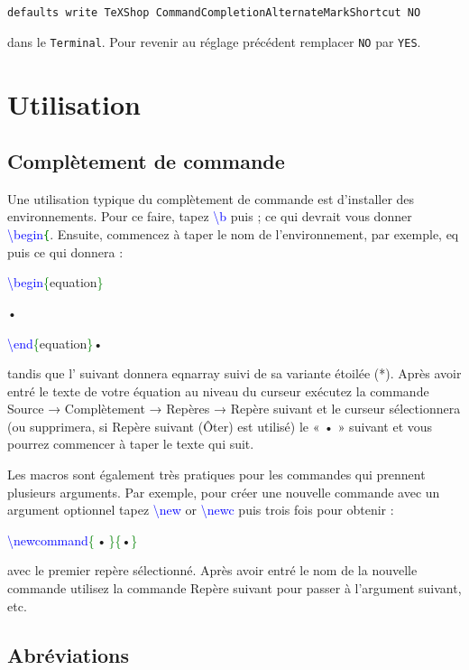 \documentclass[12pt,french]{article}
\newcommand{\esc}{{\WD \symbol{82}}}
\newcommand{\pointbleu}{\colorbox{cyan!40}{\kern-3pt•\kern-3pt}}
\newcommand{\pointbleua}{\,\colorbox{cyan!40}{\kern-4pt•\kern-4pt}\,}
\newcommand{\fontelatex}{\ttfamily}
\newcommand{\argument}[1]{{\fontelatex#1}}
\newcommand{\opt}[1]{{\fontelatex[#1]}}
\newcommand{\argt}[1]{{\fontelatex\textcolor{green}{\{}#1\textcolor{green}{\}}}}
\newcommand{\com}[1]{{\fontelatex\textcolor{blue}{\textbackslash#1}}}
\newcommand{\coma}[2]{\com{#1}\argt{#2}}
\begin{document}
\texttt{defaults write TeXShop CommandCompletionAlternateMarkShortcut NO}

\noindent dans le \texttt{Terminal}. Pour revenir au réglage précédent remplacer \texttt{NO} par \texttt{YES}.  

\section*{Utilisation}

\subsection*{Complètement de commande}

Une utilisation typique du complètement de commande est d'installer des environnements. Pour ce faire, tapez 
\com{b} puis \esc{} ; ce qui devrait vous donner \com{begin}\texttt{\textcolor{green}{\{}}. Ensuite, commencez à taper 
le nom de l'environnement, par exemple, \argument{eq} puis \esc{} ce qui donnera : 


{\parindent=0pt%
\coma{begin}{equation}%

\pointbleu

\coma{end}{equation}•
}

\noindent tandis que l'\esc{} suivant donnera \argument{eqnarray} suivi de sa variante étoilée (*). Après avoir entré le 
texte de votre équation au niveau du curseur exécutez la commande \textsf{Source} → \textsf{Complètement} → 
\textsf{Repères} → \textsf{Repère suivant} et le curseur sélectionnera (ou supprimera, si \textsf{Repère suivant 
(Ôter)} est utilisé) le « • » suivant et vous pourrez commencer à taper le texte qui suit.

Les macros sont également très pratiques pour les commandes qui prennent plusieurs arguments. Par exemple, 
pour créer une nouvelle commande avec un argument optionnel tapez \com{new} or \com{newc} puis trois fois \esc{} 
pour obtenir : 

{\parindent=0pt%
\coma{newcommand}{\pointbleua}\opt{•}\opt{•}\argt{•}
}

\noindent avec le premier repère sélectionné. Après avoir entré le nom de la nouvelle commande utilisez la 
commande \textsf{Repère suivant} pour passer à l'argument suivant, etc.

\subsection*{Abréviations}
\end{document}
